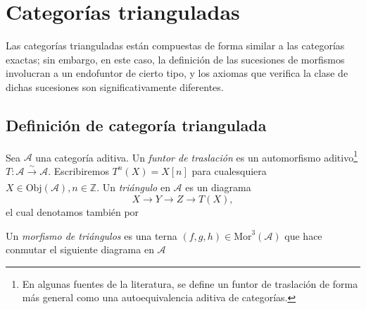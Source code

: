 \documentclass[tesis]{subfiles}
\begin{document}
\chapter{Categorías trianguladas}\label{Chap: Categorías trianguladas}

Las categorías trianguladas están compuestas de forma similar a las categorías exactas; sin embargo, en este caso, la definición de las sucesiones de morfismos involucran a un endofuntor de cierto tipo, y los axiomas que verifica la clase de dichas sucesiones son significativamente diferentes.

\section{Definición de categoría triangulada} \label{Sec: Definición de categoría triangulada}

\begin{Def}\label{Def: Triángulos}
    Sea $\mathscr{A}$ una categoría aditiva. Un \emph{funtor de traslación} es un automorfismo aditivo\footnote{En algunas fuentes de la literatura, se define un funtor de traslación de forma más general como una autoequivalencia aditiva de categorías.} $T:\mathscr{A}\xrightarrow[]{\sim} \mathscr{A}$. Escribiremos $T^n(X)=X[n]$ para cualesquiera $X\in\text{Obj}(\mathscr{A}), n\in\mathbb{Z}$. Un \emph{triángulo} en $\mathscr{A}$ es un diagrama
    \[
        X\to Y\to Z\to T(X),
    \] 
    el cual denotamos también por
    \begin{center}
    \end{center}
    Un \emph{morfismo de triángulos} es una terna $(f,g,h)\in\text{Mor}^3(\mathscr{A})$ que hace conmutar el siguiente diagrama en $\mathscr{A}$
    \begin{center}
    \end{center}
\end{Def}
\end{document}
